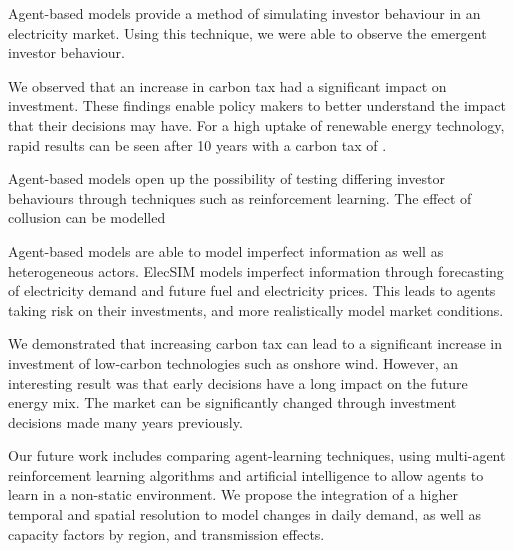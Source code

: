 
Agent-based models provide a method of simulating investor behaviour in an electricity market. Using this technique, we were able to observe the emergent investor behaviour. 

We observed that an increase in carbon tax had a significant impact on investment. These findings enable policy makers to better understand the impact that their decisions may have. For a high uptake of renewable energy technology, rapid results can be seen after 10 years with a carbon tax of .

Agent-based models open up the possibility of testing differing investor behaviours through techniques such as reinforcement learning. The effect of collusion can be modelled

Agent-based models are able to model imperfect information as well as heterogeneous actors. ElecSIM models imperfect information through forecasting of electricity demand and future fuel and electricity prices. This leads to agents taking risk on their investments, and more realistically model market conditions.

We demonstrated that increasing carbon tax can lead to a significant increase in investment of low-carbon technologies such as onshore wind. However, an interesting result was that early decisions have a long impact on the future energy mix. The market can be significantly changed through investment decisions made many years previously. 

Our future work includes comparing agent-learning techniques, using multi-agent reinforcement learning algorithms and artificial intelligence to allow agents to learn in a non-static environment. We propose the integration of a higher temporal and spatial resolution to model changes in daily demand, as well as capacity factors by region, and transmission effects.


\FloatBarrier